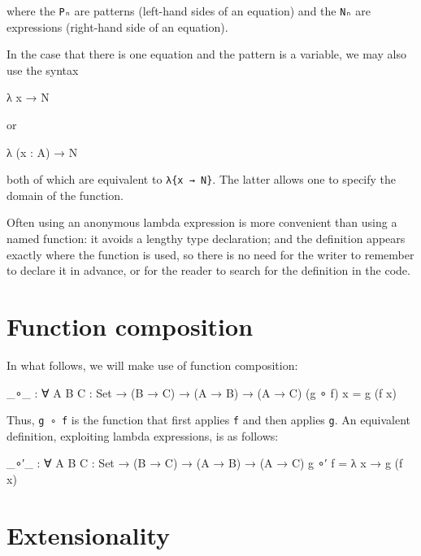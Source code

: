 where the \texttt{Pₙ} are patterns (left-hand sides of an equation) and
the \texttt{Nₙ} are expressions (right-hand side of an equation).

In the case that there is one equation and the pattern is a variable, we
may also use the syntax

\begin{myDisplay}
λ x → N
\end{myDisplay}

or

\begin{myDisplay}
λ (x : A) → N
\end{myDisplay}

both of which are equivalent to \texttt{λ\{x\ →\ N\}}. The latter allows
one to specify the domain of the function.

Often using an anonymous lambda expression is more convenient than using
a named function: it avoids a lengthy type declaration; and the
definition appears exactly where the function is used, so there is no
need for the writer to remember to declare it in advance, or for the
reader to search for the definition in the code.

\hypertarget{function-composition}{%
\section{Function composition}\label{function-composition}}

In what follows, we will make use of function composition:

\begin{fence}
\begin{code}
_∘_ : ∀ {A B C : Set} → (B → C) → (A → B) → (A → C)
(g ∘ f) x  = g (f x)
\end{code}
\end{fence}

Thus, \texttt{g\ ∘\ f} is the function that first applies \texttt{f} and
then applies \texttt{g}. An equivalent definition, exploiting lambda
expressions, is as follows:

\begin{fence}
\begin{code}
_∘′_ : ∀ {A B C : Set} → (B → C) → (A → B) → (A → C)
g ∘′ f  =  λ x → g (f x)
\end{code}
\end{fence}

\hypertarget{Isomorphism-extensionality}{%
\section{Extensionality}\label{Isomorphism-extensionality}}

